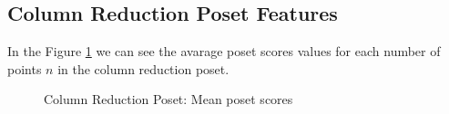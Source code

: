 \documentclass{article}
\begin{document}
\subsection{Column Reduction Poset Features}
\par In the Figure \ref{fig:scores_poset_mean_crp} we can see the avarage poset scores values for each number of points $n$ in the column reduction poset.
\begin{figure}[ht]
  \vspace{-96pt}
  \centering
  \hspace*{-0.19\textwidth}
  \caption{Column Reduction Poset: Mean poset scores}
  \label{fig:scores_poset_mean_crp}
\end{figure}
\end{document}
